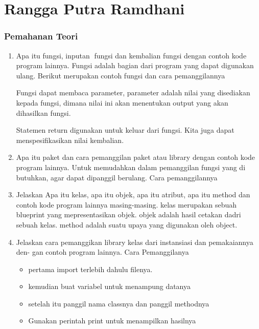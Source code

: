 \section{Rangga Putra Ramdhani}
\subsubsection{Pemahanan Teori}
\begin{enumerate}
    \item Apa itu fungsi, inputan fungsi dan kembalian fungsi dengan contoh kode program
    lainnya.
    Fungsi adalah bagian dari program yang dapat digunakan ulang.
    Berikut merupakan contoh fungsi dan cara pemanggilannya
    

    Fungsi dapat membaca parameter, parameter adalah nilai yang disediakan kepada fungsi, dimana nilai ini akan menentukan output yang akan dihasilkan fungsi.
    

    Statemen return digunakan untuk keluar dari fungsi. Kita juga dapat menspesifikasikan nilai kembalian.
    

    \item Apa itu paket dan cara pemanggilan paket atau library dengan contoh kode
    program lainnya.
    Untuk memudahkan dalam pemanggilan fungsi yang di butuhkan, agar dapat dipanggil berulang.
    Cara pemanggilannya
    

    \item Jelaskan Apa itu kelas, apa itu objek, apa itu atribut, apa itu method dan
    contoh kode program lainnya masing-masing.
    kelas merupakan sebuah blueprint yang mepresentasikan objek.
    objek adalah hasil cetakan dadri sebuah kelas.
    method adalah suatu upaya yang digunakan oleh object.
    

    \item Jelaskan cara pemanggikan library kelas dari instansiasi dan pemakaiannya den-
    gan contoh program lainnya.
    Cara Pemanggilanya 
    \begin{itemize}
        \item pertama import terlebih dahulu filenya.
        \item kemudian buat variabel untuk menampung datanya
        \item setelah itu panggil nama classnya dan panggil methodnya
        \item Gunakan perintah print untuk menampilkan hasilnya


\end{itemize}
\end{enumerate}
